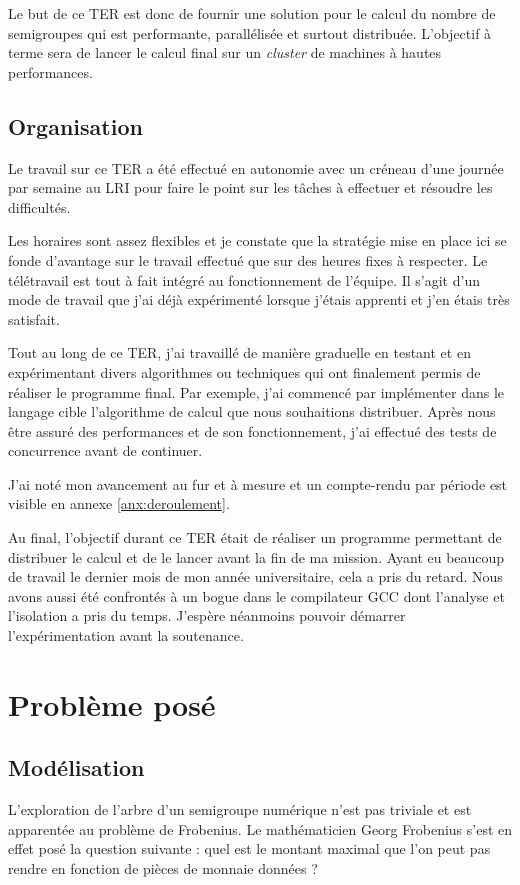 \documentclass[12pt,a4paper]{report}
\begin{document}
Le but de ce TER est donc de fournir une solution pour le calcul du nombre de semigroupes qui est performante, parallélisée et surtout distribuée. L'objectif à terme sera de lancer le calcul final sur un \emph{cluster} de machines à hautes performances.

\section{Organisation}
Le travail sur ce TER a été effectué en autonomie avec un créneau d'une journée par semaine au LRI pour faire le point sur les tâches à effectuer et résoudre les difficultés.

Les horaires sont assez flexibles et je constate que la stratégie mise en place ici se fonde d'avantage sur le travail effectué que sur des heures fixes à respecter. Le télétravail est tout à fait intégré au fonctionnement de l'équipe. Il s'agit d'un mode de travail que j'ai déjà expérimenté lorsque j'étais apprenti et j'en étais très satisfait.

Tout au long de ce TER, j'ai travaillé de manière graduelle en testant et en expérimentant divers algorithmes ou techniques qui ont finalement permis de réaliser le programme final. Par exemple, j'ai commencé par implémenter dans le langage cible l'algorithme de calcul que nous souhaitions distribuer. Après nous être assuré des performances et de son fonctionnement, j'ai effectué des tests de concurrence avant de continuer.

J'ai noté mon avancement au fur et à mesure et un compte-rendu par période est visible en annexe \ref{anx:deroulement}.

Au final, l'objectif durant ce TER était de réaliser un programme permettant de distribuer le calcul et de le lancer avant la fin de ma mission. Ayant eu beaucoup de travail le dernier mois de mon année universitaire, cela a pris du retard. Nous avons aussi été confrontés à un bogue dans le compilateur GCC dont l'analyse et l'isolation a pris du temps. J'espère néanmoins pouvoir démarrer l'expérimentation avant la soutenance.

\chapter{Problème posé}

\section{Modélisation}
L'exploration de l'arbre d'un semigroupe numérique n'est pas triviale et est apparentée au problème de Frobenius. Le mathématicien Georg Frobenius s'est en effet posé la question suivante : quel est le montant maximal que l'on peut pas rendre en fonction de pièces de monnaie données ?
\end{document}
